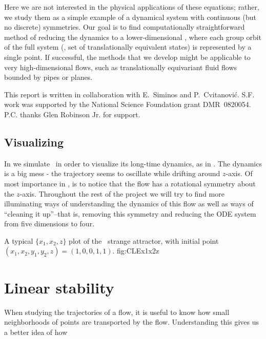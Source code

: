 Here we are not interested in the physical applications of
these equations; rather, we study them as a simple example of
a dynamical system with continuous (but no discrete)
symmetries. Our goal is to find computationally
straightforward method of reducing the dynamics to a
lower-dimensional \statesp, where each group orbit of the
full system (\ie, set of translationally equivalent states)
is represented by a single point. If successful, the methods
that we develop might be applicable to very high-dimensional
flows, such as translationally equivariant fluid flows
bounded by pipes or planes.

This report is written in collaboration with
E.~Siminos and P.~Cvitanovi\'c.
S.F. work was supported by the National Science Foundation
grant DMR~0820054.
P.C. thanks Glen Robinson Jr. for support.

\subsection{Visualizing \cLf}

In  we simulate \cLf\ in order to
visualize its long-time dynamics, as in
. The dynamics is a big mess - the
trajectory seems to oscillate while drifting around $z$-axis.
Of most importance in , is to notice
that the flow has a rotational symmetry about the $z$-axis.
Throughout the rest of the project we will try to find more
illuminating ways of understanding the dynamics of this flow
as well as ways of ``cleaning it up''--that is, removing this
symmetry and reducing the ODE system from five dimensions to
four.

{}{
A typical $\{x_1,x_2,z\}$ plot of the \cLf\ strange attractor,
with initial point
$(x_1, x_2, y_1, y_2, z) = (1, 0, 0, 1, 1)$.
    }{fig:CLEx1x2z}


\section{Linear stability}
\label{sect:stability}
When studying the trajectories of a flow, it is useful to know how small neighborhoods of points are transported by the flow. Understanding this gives us a better idea of how

